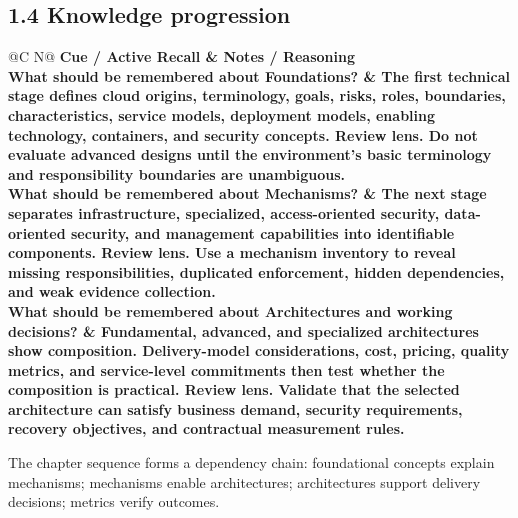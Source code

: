 \documentclass[11pt]{article}
\newcommand{\CornellHeader}{\rowcolor{Navy}\color{white}\bfseries Cue / Active Recall & \color{white}\bfseries Notes / Reasoning \\\endhead}
\newcommand{\CornellRow}[2]{\cellcolor{CueGray}\textbf{#1} & #2 \\\addlinespace[3pt]}
\begin{document}
\subsection{1.4 Knowledge progression}
\begin{longtable}{@{}C N@{}}
\CornellHeader
\CornellRow{What should be remembered about Foundations?}{The first technical stage defines cloud origins, terminology, goals, risks, roles, boundaries, characteristics, service models, deployment models, enabling technology, containers, and security concepts. \textbf{Review lens.} Do not evaluate advanced designs until the environment's basic terminology and responsibility boundaries are unambiguous.}
\CornellRow{What should be remembered about Mechanisms?}{The next stage separates infrastructure, specialized, access-oriented security, data-oriented security, and management capabilities into identifiable components. \textbf{Review lens.} Use a mechanism inventory to reveal missing responsibilities, duplicated enforcement, hidden dependencies, and weak evidence collection.}
\CornellRow{What should be remembered about Architectures and working decisions?}{Fundamental, advanced, and specialized architectures show composition. Delivery-model considerations, cost, pricing, quality metrics, and service-level commitments then test whether the composition is practical. \textbf{Review lens.} Validate that the selected architecture can satisfy business demand, security requirements, recovery objectives, and contractual measurement rules.}
\end{longtable}
\begin{sectionsummarybox}
The chapter sequence forms a dependency chain: foundational concepts explain mechanisms; mechanisms enable architectures; architectures support delivery decisions; metrics verify outcomes.
\end{sectionsummarybox}
\end{document}
